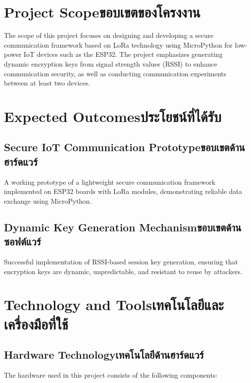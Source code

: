 \section{\ifenglish Project Scope\else ขอบเขตของโครงงาน\fi}
The scope of this project focuses on designing and developing a secure communication framework based on LoRa technology using MicroPython for low-power IoT devices such as the ESP32. The project emphasizes generating dynamic encryption keys from signal strength values (RSSI) to enhance communication security, as well as conducting communication experiments between at least two devices.

\section{\ifenglish Expected Outcomes\else ประโยชน์ที่ได้รับ\fi}

\subsection{\ifenglish Secure IoT Communication Prototype\else ขอบเขตด้านฮาร์ดแวร์\fi}

A working prototype of a lightweight secure communication framework implemented on ESP32 boards with LoRa modules, demonstrating reliable data exchange using MicroPython.


\subsection{\ifenglish  Dynamic Key Generation Mechanism\else ขอบเขตด้านซอฟต์แวร์\fi}

Successful implementation of RSSI-based session key generation, ensuring that encryption keys are dynamic, unpredictable, and resistant to reuse by attackers.


\section{\ifenglish Technology and Tools\else เทคโนโลยีและเครื่องมือที่ใช้\fi}

\subsection{\ifenglish Hardware Technology\else เทคโนโลยีด้านฮาร์ดแวร์\fi}
The hardware used in this project consists of the following components:

